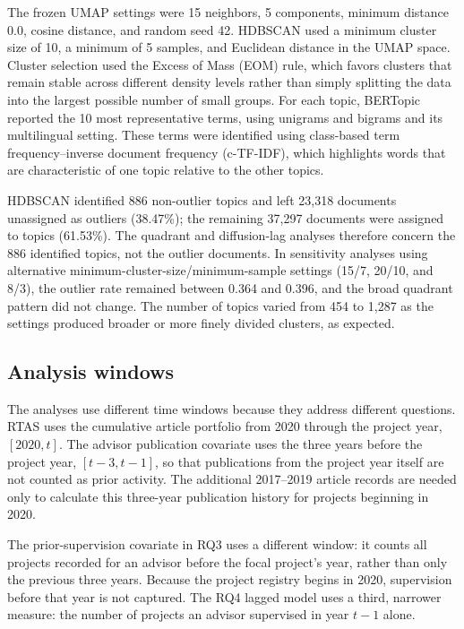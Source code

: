 \documentclass[pdflatex,sn-apa]{sn-jnl}
\begin{document}
The frozen UMAP settings were 15 neighbors, 5 components, minimum distance 0.0, cosine distance, and random seed 42. HDBSCAN used a minimum cluster size of 10, a minimum of 5 samples, and Euclidean distance in the UMAP space. Cluster selection used the Excess of Mass (EOM) rule, which favors clusters that remain stable across different density levels rather than simply splitting the data into the largest possible number of small groups. For each topic, BERTopic reported the 10 most representative terms, using unigrams and bigrams and its multilingual setting. These terms were identified using class-based term frequency--inverse document frequency (c-TF-IDF), which highlights words that are characteristic of one topic relative to the other topics.

HDBSCAN identified 886 non-outlier topics and left 23,318 documents unassigned as outliers (38.47\%); the remaining 37,297 documents were assigned to topics (61.53\%). The quadrant and diffusion-lag analyses therefore concern the 886 identified topics, not the outlier documents. In sensitivity analyses using alternative minimum-cluster-size/minimum-sample settings (15/7, 20/10, and 8/3), the outlier rate remained between 0.364 and 0.396, and the broad quadrant pattern did not change. The number of topics varied from 454 to 1,287 as the settings produced broader or more finely divided clusters, as expected.

\subsection{Analysis windows}

The analyses use different time windows because they address different questions. RTAS uses the cumulative article portfolio from 2020 through the project year, $[2020,t]$. The advisor publication covariate uses the three years before the project year, $[t-3,t-1]$, so that publications from the project year itself are not counted as prior activity. The additional 2017--2019 article records are needed only to calculate this three-year publication history for projects beginning in 2020.

The prior-supervision covariate in RQ3 uses a different window: it counts all projects recorded for an advisor before the focal project's year, rather than only the previous three years. Because the project registry begins in 2020, supervision before that year is not captured. The RQ4 lagged model uses a third, narrower measure: the number of projects an advisor supervised in year $t-1$ alone.
\end{document}
